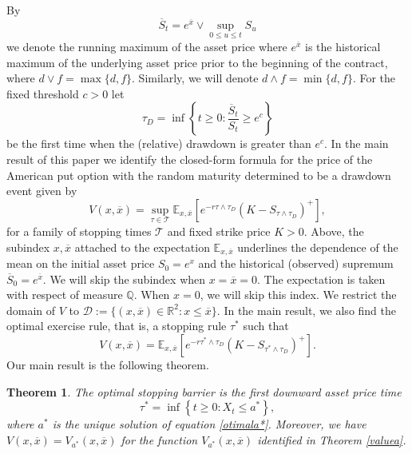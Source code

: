 \documentclass[10pt]{amsart}
\def\E{{\mathbb{E}}}
\def\Q{{\mathbb{Q}}}
\def \R{{{\rm I{\!}\rm R}}}
\def\E{{\mathbb E}} \def\PP{\mc P} \def\Z{{\mathbb Z}} \def\R{{\mathbb R}}
\newtheorem{Thm}{Theorem}
\begin{document}
	By
	\begin{equation*}
		\overline{S}_t = e^{\overline{x}}\vee \sup_{0 \leq u \leq t} S_u
	\end{equation*}
	we denote the running maximum of the asset price where
	$e^{\overline{x}}$ is the historical maximum of the underlying asset price prior to the beginning of the contract, where $d\vee f = \max\{d,f\}$. Similarly, we will denote $d\wedge f = \min\{d,f\}$.
	For the fixed threshold $c>0$ let
	\begin{equation*}
		\tau_D = \inf \left\{ t \geq 0: \frac{\overline{S}_t}{S_t} \geq e^c \right\}
	\end{equation*}
	be the first time when the (relative) drawdown is greater than $e^c$.
	In the main result of this paper we identify the closed-form formula for the price of the American put option with the random maturity determined to be a drawdown event given by
	\begin{equation*}
		V(x, \overline{x}) = \sup_{\tau \in \mathcal{T}} \E_{x,\overline{x}} \left[e^{-r\tau\wedge\tau_D}(K - S_{\tau\wedge\tau_D})^+\right],
	\end{equation*}
	for a family of stopping times $\mathcal{T}$ and fixed strike price $K > 0$.
	Above, the subindex $x,\overline{x}$ attached to the expectation $\E_{x,\overline{x}}$ underlines the dependence of the mean on
	the initial asset price $S_0=e^x$ and the historical (observed) supremum $\overline{S}_0=e^{\overline{x}}$. We will skip the subindex when $x=\overline{x}=0$.
	The expectation is taken with respect of measure $\Q$.
	When $x=0$, we will skip this index. We restrict the domain of $V$ to $\mathcal{D} := \{ (x, \overline{x}) \in \mathbb{R}^2 : x \leq \overline{x}\}$.
	In the main result, we also find the optimal exercise rule, that is, a stopping rule $\tau^*$ such that
	\begin{equation*}
		V(x, \overline{x}) = \E_{x,\overline{x}} [e^{-r\tau^*\wedge\tau_D}(K - S_{\tau^*\wedge\tau_D})^+].
	\end{equation*}
	Our main result is the following theorem.
	\begin{Thm}\label{thm2}
		The optimal stopping barrier is the first downward asset price time
		\begin{equation*}
			\tau^*=\inf\left\{t\geq 0: X_t\leq a^*\right\},
		\end{equation*}
		where $a^*$ is the unique solution of equation \eqref{otimala*}.
		Moreover, we have $V(x, \overline{x})=V_{a^*}(x, \overline{x})$
		for the function $V_{a^*}(x, \overline{x})$ identified in  Theorem \ref{valuea}.
	\end{Thm}
	
\end{document}
